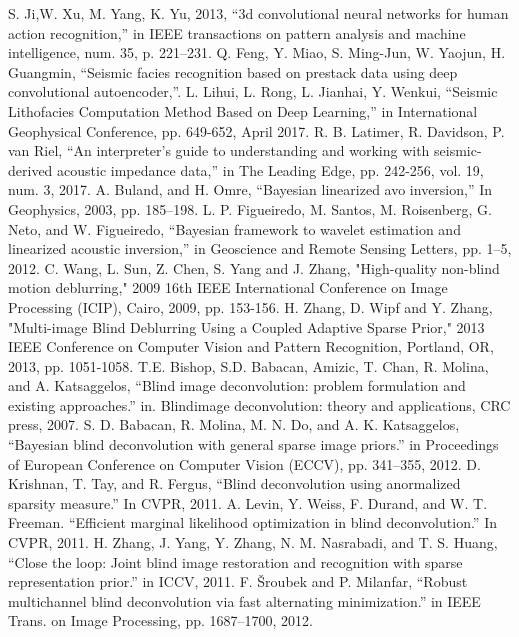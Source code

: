 \documentclass[conference]{IEEEtran}
\begin{document}
\begin{thebibliography}{00}
		S. Ji,W. Xu, M. Yang, K. Yu, 2013, ``3d convolutional neural networks for human action recognition,'' in IEEE transactions on pattern analysis and machine intelligence, num. 35, p. 221–231.
			Q. Feng, Y. Miao, S. Ming-Jun, W. Yaojun, H. Guangmin, ``Seismic facies recognition based on prestack data using deep convolutional autoencoder,''.
 			L. Lihui, L. Rong, L. Jianhai, Y. Wenkui, ``Seismic Lithofacies Computation Method Based on Deep Learning,'' in International Geophysical Conference, pp. 649-652, April 2017.
 		R. B. Latimer, R. Davidson, P. van Riel, ``An interpreter's guide to understanding and working with seismic-derived acoustic impedance data,'' in The Leading Edge, pp. 242-256, vol. 19, num. 3, 2017.
		A. Buland,  and H. Omre, ``Bayesian linearized avo inversion,'' In Geophysics, 2003, pp. 185–198.
	L. P. Figueiredo, M. Santos, M. Roisenberg, G. Neto, and W. Figueiredo, ``Bayesian framework to wavelet estimation and linearized acoustic inversion,'' in Geoscience and Remote Sensing Letters, pp. 1–5, 2012.
		C. Wang, L. Sun, Z. Chen, S. Yang and J. Zhang, "High-quality non-blind motion deblurring," 2009 16th IEEE International Conference on Image Processing (ICIP), Cairo, 2009, pp. 153-156.
		H. Zhang, D. Wipf and Y. Zhang, "Multi-image Blind Deblurring Using a Coupled Adaptive Sparse Prior," 2013 IEEE Conference on Computer Vision and Pattern Recognition, Portland, OR, 2013, pp. 1051-1058.
		T.E. Bishop, S.D. Babacan, Amizic, T. Chan, R. Molina, and A. Katsaggelos, ``Blind image deconvolution: problem formulation and existing approaches.'' in. Blindimage deconvolution: theory and applications,  CRC press, 2007.
		S. D. Babacan, R. Molina, M. N. Do, and A. K. Katsaggelos, ``Bayesian blind deconvolution with general sparse image priors.'' in Proceedings of European Conference on Computer Vision (ECCV), pp. 341–355, 2012.
		D. Krishnan, T. Tay, and R. Fergus, ``Blind deconvolution using anormalized sparsity measure.'' In CVPR, 2011.
		A. Levin, Y. Weiss, F. Durand, and W. T. Freeman. ``Efficient marginal likelihood optimization in blind deconvolution.'' In CVPR, 2011.
		H. Zhang, J. Yang, Y. Zhang, N. M. Nasrabadi, and T. S. Huang, ``Close the loop: Joint blind image restoration and recognition with sparse representation prior.'' in ICCV, 2011. 
		F. Šroubek and P. Milanfar, ``Robust multichannel blind deconvolution via fast alternating minimization.'' in IEEE Trans. on Image Processing, pp. 1687–1700, 2012.

\end{thebibliography}
\end{document}
